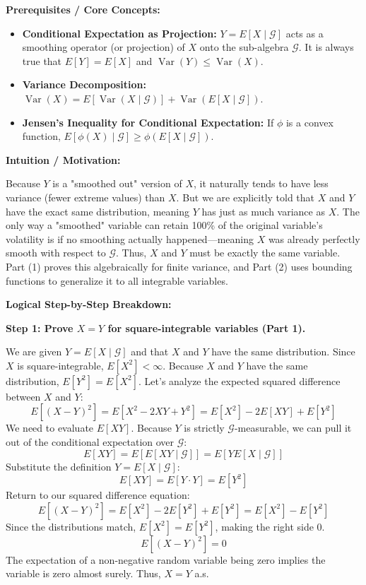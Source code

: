 \begin{solution}
\textbf{Prerequisites / Core Concepts:}
\begin{itemize}
    \item \textbf{Conditional Expectation as Projection:} $Y = E[X \mid \mathcal{G}]$ acts as a smoothing operator (or projection) of $X$ onto the sub-algebra $\mathcal{G}$. It is always true that $E[Y] = E[X]$ and $\operatorname{Var}(Y) \leq \operatorname{Var}(X)$.
    \item \textbf{Variance Decomposition:} $\operatorname{Var}(X) = E[\operatorname{Var}(X \mid \mathcal{G})] + \operatorname{Var}(E[X \mid \mathcal{G}])$.
    \item \textbf{Jensen's Inequality for Conditional Expectation:} If $\phi$ is a convex function, $E[\phi(X) \mid \mathcal{G}] \geq \phi(E[X \mid \mathcal{G}])$.
\end{itemize}

\textbf{Intuition / Motivation:}

Because $Y$ is a "smoothed out" version of $X$, it naturally tends to have less variance (fewer extreme values) than $X$. But we are explicitly told that $X$ and $Y$ have the exact same distribution, meaning $Y$ has just as much variance as $X$. The only way a "smoothed" variable can retain 100\% of the original variable's volatility is if no smoothing actually happened—meaning $X$ was already perfectly smooth with respect to $\mathcal{G}$. Thus, $X$ and $Y$ must be exactly the same variable. Part (1) proves this algebraically for finite variance, and Part (2) uses bounding functions to generalize it to all integrable variables.

\textbf{Logical Step-by-Step Breakdown:}

\textbf{Step 1: Prove $X = Y$ for square-integrable variables (Part 1).}

We are given $Y = E[X \mid \mathcal{G}]$ and that $X$ and $Y$ have the same distribution.
Since $X$ is square-integrable, $E[X^2] < \infty$. Because $X$ and $Y$ have the same distribution, $E[Y^2] = E[X^2]$.
Let's analyze the expected squared difference between $X$ and $Y$:
\[ E[(X-Y)^2] = E[X^2 - 2XY + Y^2] = E[X^2] - 2E[XY] + E[Y^2] \]
We need to evaluate $E[XY]$. Because $Y$ is strictly $\mathcal{G}$-measurable, we can pull it out of the conditional expectation over $\mathcal{G}$:
\[ E[XY] = E[E[XY \mid \mathcal{G}]] = E[Y E[X \mid \mathcal{G}]] \]
Substitute the definition $Y = E[X \mid \mathcal{G}]$:
\[ E[XY] = E[Y \cdot Y] = E[Y^2] \]
Return to our squared difference equation:
\[ E[(X-Y)^2] = E[X^2] - 2E[Y^2] + E[Y^2] = E[X^2] - E[Y^2] \]
Since the distributions match, $E[X^2] = E[Y^2]$, making the right side 0.
\[ E[(X-Y)^2] = 0 \]
The expectation of a non-negative random variable being zero implies the variable is zero almost surely. Thus, $X = Y$ a.s.


\end{solution}
